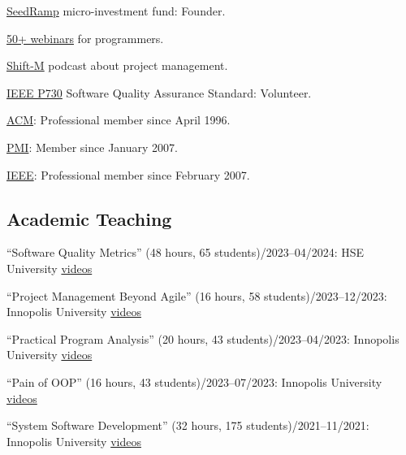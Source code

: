 \documentclass{yb}
\begin{document}
\href{https:www.seedramp.com/}{SeedRamp} micro-investment fund: Founder.

\href{https://www.yegor256.com/webinars.html}{50+ webinars} for programmers.

\href{https://www.yegor256.com/shift-m.html}{Shift-M} podcast about project management.

\href{http://ieeexplore.ieee.org/document/6835311/}{IEEE P730} Software Quality Assurance Standard: Volunteer.

\href{https://www.acm.org}{ACM}: Professional member since April 1996.

\href{https://certification.pmi.org/registry.aspx}{PMI}: Member since January 2007.

\href{https://www.ieee.org}{IEEE}: Professional member since February 2007.

\subsection*{Academic Teaching}

``Software Quality Metrics'' (48 hours, 65 students)/2023--04/2024: HSE University\newline
\href{https://www.youtube.com/playlist?list=PLaIsQH4uc08xyXRhhYPHh-Yam2kEwNaLl}{videos}

``Project Management Beyond Agile'' (16 hours, 58 students)/2023--12/2023: Innopolis University\newline
\href{https://www.youtube.com/playlist?list=PLaIsQH4uc08x_T-Aelduv3Zf0DWRx40pq}{videos}

``Practical Program Analysis'' (20 hours, 43 students)/2023--04/2023: Innopolis University\newline
\href{https://www.youtube.com/playlist?list=PLaIsQH4uc08wdXIC4utfgMxV_iswE9_Md}{videos}

``Pain of OOP'' (16 hours, 43 students)/2023--07/2023: Innopolis University\newline
\href{https://www.youtube.com/playlist?list=PLaIsQH4uc08ytf8POIIAkkR4ZsRq8DFiV}{videos}

``System Software Development'' (32 hours, 175 students)/2021--11/2021: Innopolis University\newline
\href{https://www.youtube.com/playlist?list=PLaIsQH4uc08woJKRAA7mmjs9fU0jeKjjM}{videos}
\end{document}
